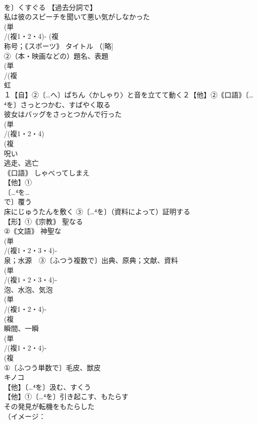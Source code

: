 \documentclass[8pt]{extreport}
\begin{document}
\begin{CJK}{UTF8}{min}
\\	を〕くすぐる 【過去分詞で】
\\	私は彼のスピーチを聞いて悪い気がしなかった
\\	(単
\\	/(複1・2・4)- (複
\\	称号；｟スポーツ｠ タイトル （[略]
\\	②（本・映画などの）題名、表題
\\	(単
\\	/(複
\\	虹 
\\	１【自】②〔…へ〕ぱちん〈かしゃり〉と音を立てて動く２【他】②｟口語｠〔…⁴を〕さっとつかむ、すばやく取る 
\\	彼女はバッグをさっとつかんで行った
\\	(単
\\	/(複1・2・4)
\\	(複
\\	呪い 
\\	逃走、逃亡
\\	｟口語｠ しゃべってしまえ
\\	【他】①
\\	〔…⁴を…
\\	で〕覆う 
\\	床にじゅうたんを敷く ③〔…⁴を〕（資料によって）証明する
\\	【形】①｟宗教｠ 聖なる 
\\	②｟文語｠ 神聖な
\\	(単
\\	/(複1・2・3・4)‐
\\	泉；水源　③〔ふつう複数で〕出典、原典；文献、資料 
\\	(単
\\	/(複1・2・3・4)‐
\\	泡、水泡、気泡 
\\	(単
\\	/(複1・2・4)-
\\	(複
\\	瞬間、一瞬 
\\	(単
\\	/(複1・2・4)-
\\	(複
\\	①〔ふつう単数で〕毛皮、獣皮 
\\	キノコ 
\\	【他】〔…⁴を〕汲む、すくう 
\\	【他】①〔…⁴を〕引き起こす、もたらす 
\\	その発見が転機をもたらした 
\\	（イメージ：

\end{CJK}
\end{document}
